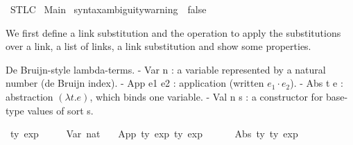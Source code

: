 %
\begin{isabellebody}%
%
%
\isadelimdocument
%
\endisadelimdocument
%
\isatagdocument
%
\isamarkuptrue%
%
\isamarkuptrue%
%
\endisatagdocument
{\isafolddocument}%
%
\isadelimdocument
%
\endisadelimdocument
%
\isadelimtheory
%
\endisadelimtheory
%
\isatagtheory
{}\isamarkupfalse%
\ STLC\isanewline
{}\ Main\isanewline
{}%
\endisatagtheory
{\isafoldtheory}%
%
\isadelimtheory
\isanewline
%
\endisadelimtheory
\isanewline
\isanewline
{}\isamarkupfalse%
\ {\isacharbrackleft}{\kern0pt}{\isacharbrackleft}{\kern0pt}syntax{\isacharunderscore}{\kern0pt}ambiguity{\isacharunderscore}{\kern0pt}warning\ {\isacharequal}{\kern0pt}\ false{\isacharbrackright}{\kern0pt}{\isacharbrackright}{\kern0pt}%
\isadelimdocument
%
\endisadelimdocument
%
\isatagdocument
%
\isamarkuptrue%
%
\endisatagdocument
{\isafolddocument}%
%
\isadelimdocument
%
\endisadelimdocument
%
\begin{isamarkuptext}%
We first define a link substitution and the operation to apply the substitutions
  over a link, a list of links, a link substitution
  and show some properties.%
\end{isamarkuptext}\isamarkuptrue%
%
\begin{isamarkuptext}%
De Bruijn-style lambda-terms.
  - Var n : a variable represented by a natural number (de Bruijn index).
  - App e1 e2 : application (written $e_1 \cdot e_2$).
  - Abs t e : abstraction $(\lambda t. e)$, which binds one variable.
  - Val n s : a constructor for base-type values of sort s.%
\end{isamarkuptext}\isamarkuptrue%
\isamarkupfalse%
\ {\isacharprime}{\kern0pt}ty\ exp\ {\isacharequal}{\kern0pt}\isanewline
\ \ \ \ Var\ nat\isanewline
\ \ {\isacharbar}{\kern0pt}\ App\ {\isachardoublequoteopen}{\isacharprime}{\kern0pt}ty\ exp{\isachardoublequoteclose}\ {\isachardoublequoteopen}{\isacharprime}{\kern0pt}ty\ exp{\isachardoublequoteclose}\ {\isacharparenleft}{\kern0pt}\ {\isacartoucheopen}{\isasymcdot}{\isacartoucheclose}\ {}{}{}{\isacharparenright}{\kern0pt}\isanewline
\ \ {\isacharbar}{\kern0pt}\ Abs\ {\isacharprime}{\kern0pt}ty\ {\isachardoublequoteopen}{\isacharprime}{\kern0pt}ty\ exp{\isachardoublequoteclose}\isanewline

\end{isabellebody}
